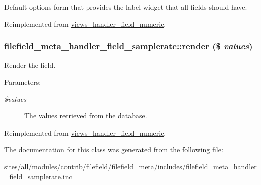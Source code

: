Default options form that provides the label widget that all fields should have. 

Reimplemented from \hyperlink{classviews__handler__field__numeric_e6f81d1896ece64e9450ebc2d60da2fd}{views\_\-handler\_\-field\_\-numeric}.\hypertarget{classfilefield__meta__handler__field__samplerate_8dd9fcfcf352e9699f02deed43a60e2c}{
\subsubsection[{render}]{\setlength{\rightskip}{0pt plus 5cm}filefield\_\-meta\_\-handler\_\-field\_\-samplerate::render (\$ {\em values})}}
\label{classfilefield__meta__handler__field__samplerate_8dd9fcfcf352e9699f02deed43a60e2c}


Render the field.

\begin{Desc}
\item[Parameters:]
\begin{description}
\item[{\em \$values}]The values retrieved from the database. \end{description}
\end{Desc}


Reimplemented from \hyperlink{classviews__handler__field__numeric_9c76aeef951c45385fd91a22e5e656aa}{views\_\-handler\_\-field\_\-numeric}.

The documentation for this class was generated from the following file:\begin{CompactItemize}
\item 
sites/all/modules/contrib/filefield/filefield\_\-meta/includes/\hyperlink{filefield__meta__handler__field__samplerate_8inc}{filefield\_\-meta\_\-handler\_\-field\_\-samplerate.inc}\end{CompactItemize}
